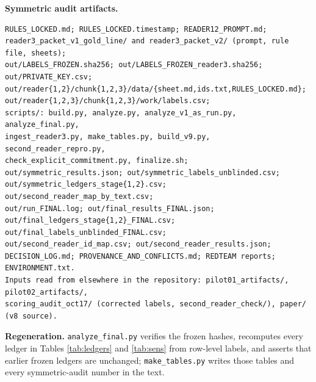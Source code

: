 \documentclass[10pt]{article}
\begin{document}
\textbf{Symmetric audit artifacts.}
\begin{Verbatim}[breaklines=true,breakanywhere=true,fontsize=\small]
RULES_LOCKED.md; RULES_LOCKED.timestamp; READER12_PROMPT.md;
reader3_packet_v1_gold_line/ and reader3_packet_v2/ (prompt, rule file, sheets);
out/LABELS_FROZEN.sha256; out/LABELS_FROZEN_reader3.sha256; out/PRIVATE_KEY.csv;
out/reader{1,2}/chunk{1,2,3}/data/{sheet.md,ids.txt,RULES_LOCKED.md};
out/reader{1,2,3}/chunk{1,2,3}/work/labels.csv;
scripts/: build.py, analyze.py, analyze_v1_as_run.py, analyze_final.py,
ingest_reader3.py, make_tables.py, build_v9.py, second_reader_repro.py,
check_explicit_commitment.py, finalize.sh;
out/symmetric_results.json; out/symmetric_labels_unblinded.csv;
out/symmetric_ledgers_stage{1,2}.csv; out/second_reader_map_by_text.csv;
out/run_FINAL.log; out/final_results_FINAL.json;
out/final_ledgers_stage{1,2}_FINAL.csv; out/final_labels_unblinded_FINAL.csv;
out/second_reader_id_map.csv; out/second_reader_results.json;
DECISION_LOG.md; PROVENANCE_AND_CONFLICTS.md; REDTEAM reports; ENVIRONMENT.txt.
Inputs read from elsewhere in the repository: pilot01_artifacts/, pilot02_artifacts/,
scoring_audit_oct17/ (corrected labels, second_reader_check/), paper/ (v8 source).

\end{Verbatim}

\textbf{Regeneration.} \texttt{analyze\_final.py} verifies the frozen hashes, recomputes every ledger in Tables \ref{tab:ledgers} and \ref{tab:sens} from row-level labels, and asserts that earlier frozen ledgers are unchanged; \texttt{make\_tables.py} writes those tables and every symmetric-audit number in the text.
\end{document}
